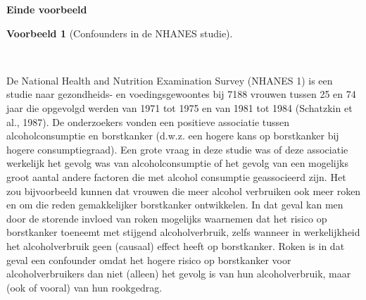 \documentclass[
  dutch,
  letterpaper,
  12pt]{book}
\theoremstyle{definition}
\theoremstyle{definition}
\theoremstyle{definition}
\newtheorem{example}{Voorbeeld}[chapter]
\theoremstyle{remark}
\begin{document}
\begin{table}

\caption{\label{tbl-sexbias}}


\end{table}%

\textbf{Einde voorbeeld}

\begin{example}[Confounders in de NHANES
studie]\protect\hypertarget{exm-confounders-in-de-nhanes-studie}{}\label{exm-confounders-in-de-nhanes-studie}

~

\end{example}

De National Health and Nutrition Examination Survey (NHANES 1) is een
studie naar gezondheids- en voedingsgewoontes bij 7188 vrouwen tussen 25
en 74 jaar die opgevolgd werden van 1971 tot 1975 en van 1981 tot 1984
(Schatzkin et al., 1987). De onderzoekers vonden een positieve
associatie tussen alcoholconsumptie en borstkanker (d.w.z. een hogere
kans op borstkanker bij hogere consumptiegraad). Een grote vraag in deze
studie was of deze associatie werkelijk het gevolg was van
alcoholconsumptie of het gevolg van een mogelijks groot aantal andere
factoren die met alcohol consumptie geassocieerd zijn. Het zou
bijvoorbeeld kunnen dat vrouwen die meer alcohol verbruiken ook meer
roken en om die reden gemakkelijker borstkanker ontwikkelen. In dat
geval kan men door de storende invloed van roken mogelijks waarnemen dat
het risico op borstkanker toeneemt met stijgend alcoholverbruik, zelfs
wanneer in werkelijkheid het alcoholverbruik geen (causaal) effect heeft
op borstkanker. Roken is in dat geval een confounder omdat het hogere
risico op borstkanker voor alcoholverbruikers dan niet (alleen) het
gevolg is van hun alcoholverbruik, maar (ook of vooral) van hun
rookgedrag.
\end{document}
